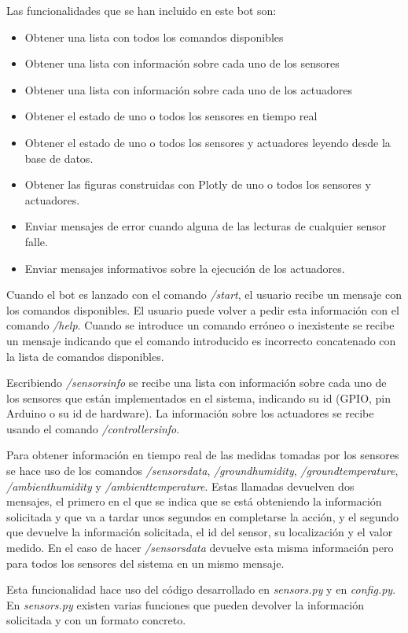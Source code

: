 \documentclass[a4paper, 12pt, oneside]{book}
\begin{document}
Las funcionalidades que se han incluido en este bot son:
\begin{itemize}
\item Obtener una lista con todos los comandos disponibles
\item Obtener una lista con información sobre cada uno de los sensores
\item Obtener una lista con información sobre cada uno de los actuadores
\item Obtener el estado de uno o todos los sensores en tiempo real
\item Obtener el estado de uno o todos los sensores y actuadores leyendo desde la base de datos.
\item Obtener las figuras construidas con Plotly de uno o todos los sensores y actuadores.
\item Enviar mensajes de error cuando alguna de las lecturas de cualquier sensor falle.
\item Enviar mensajes informativos sobre la ejecución de los actuadores.
\end{itemize}

Cuando el bot es lanzado con el comando \textit{/start}, el usuario recibe un mensaje con los comandos disponibles. El usuario puede volver a pedir esta información con el comando \textit{/help}.
Cuando se introduce un comando erróneo o inexistente se recibe un mensaje indicando que el comando introducido es incorrecto concatenado con la lista de comandos disponibles.

Escribiendo \textit{/sensorsinfo} se recibe una lista con información sobre cada uno de los sensores que están implementados en el sistema, indicando su id (GPIO, pin Arduino o su id de hardware). La información sobre los actuadores se recibe usando el comando \textit{/controllersinfo}.

Para obtener información en tiempo real de las medidas tomadas por los sensores se hace uso de los comandos \textit{/sensorsdata}, \textit{/groundhumidity}, \textit{/groundtemperature}, \textit{/ambienthumidity} y \textit{/ambienttemperature}. Estas llamadas devuelven dos mensajes, el primero en el que se indica que se está obteniendo la información solicitada y que va a tardar unos segundos en completarse la acción, y el segundo que devuelve la información solicitada, el id del sensor, su localización y el valor medido. En el caso de hacer \textit{/sensorsdata} devuelve esta misma información pero para todos los sensores del sistema en un mismo mensaje.

Esta funcionalidad hace uso del código desarrollado en \textit{sensors.py} y en \textit{config.py}. En \textit{sensors.py} existen varias funciones que pueden devolver la información solicitada y con un formato concreto. 
\end{document}

